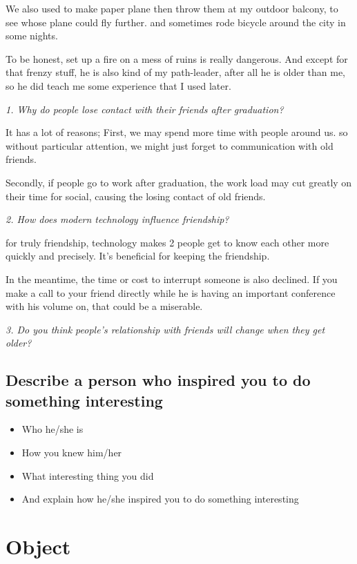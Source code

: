 \documentclass[conference]{IEEEtran}
\begin{document}
We also used to make paper plane then throw them at my outdoor balcony, to see whose plane could fly further.
and sometimes rode bicycle around the city in some nights. 

To be honest, set up a fire on a mess of ruins is really dangerous. And except for that frenzy stuff,
he is also kind of my path-leader, after all he is older than me, so he did teach me some experience
that I used later.

\textit{1. Why do people lose contact with their friends after graduation?}

It has a lot of reasons;
First, we may spend more time with people around us. so without particular attention,
we might just forget to communication with old friends.

Secondly, if people go to work after graduation, the work load may cut greatly on their time
for social, causing the losing contact of old friends.

\textit{2. How does modern technology influence friendship?}

for truly friendship, technology makes 2 people get to know each other more quickly and precisely.
It's beneficial for keeping the friendship.

In the meantime, the time or cost to interrupt someone is also declined. If you make a call to your
friend directly while he is having an important conference with his volume on, that could be a miserable.

\textit{3. Do you think people's relationship with friends will change when they get older?}



\subsection{Describe a person who inspired you to do something interesting}

\begin{itemize}
    \item Who he/she is
    \item How you knew him/her
    \item What interesting thing you did
    \item And explain how he/she inspired you to do something interesting
\end{itemize}



\section{Object}
\end{document}
